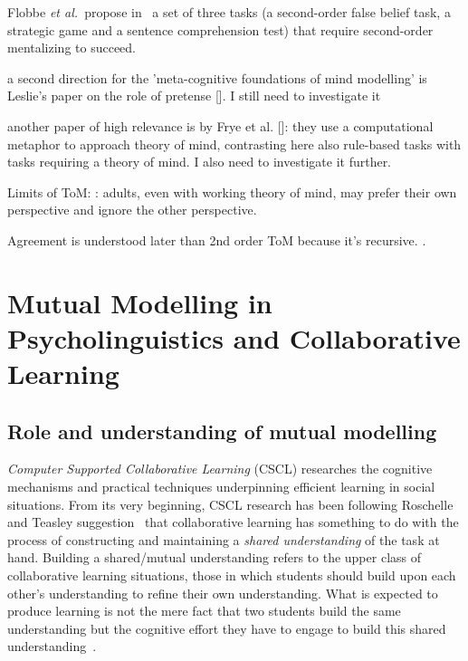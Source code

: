 \documentclass{sig-alternate}
\newcommand{\etal}{{\textit{et al.~}}}
\begin{document}
Flobbe \etal propose in~\cite{flobbe2008children} a set of three tasks (a
second-order false belief task, a strategic game and a sentence comprehension
test) that require second-order mentalizing to succeed.

a second direction for the 'meta-cognitive foundations of mind modelling' is
Leslie's paper on the role of pretense []. I still need to investigate it

another paper of high relevance is by Frye et al. []: they use a computational
metaphor to approach theory of mind, contrasting here also
rule-based tasks with tasks requiring a theory of mind. I also need to
investigate it further.

Limits of ToM:
\cite{keysar2003limits}: adults, even with working theory of mind, may prefer
their own perspective and ignore the other perspective.

Agreement is understood later than 2nd order ToM because it's recursive.
\cite[p.~664]{verbrugge2009logic}.

\section{Mutual Modelling in Psycholinguistics and Collaborative Learning}

\subsection{Role and understanding of mutual modelling}

\emph{Computer Supported Collaborative Learning} (CSCL) researches the cognitive
mechanisms and practical techniques underpinning efficient learning in social
situations. From its very beginning, CSCL research has been following
Roschelle and Teasley suggestion~\cite{roschelle1995construction} that
collaborative learning has something to do with the process of constructing and
maintaining a \emph{shared understanding} of the task at hand. Building a shared/mutual
understanding refers to the upper class of collaborative learning situations,
those in which students should build upon each other's understanding to refine
their own understanding.  What is expected to produce learning is not the mere
fact that two students build the same understanding but the cognitive effort
they have to engage to build this shared
understanding~\cite{schwartz1995emergence}.
\end{document}
